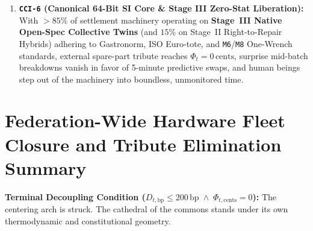 \begin{enumerate}
    \item \textbf{\texttt{CCI-6} (Canonical 64-Bit SI Core \& Stage III Zero-Stat Liberation):} With $>85\%$ of settlement machinery operating on \textbf{Stage~III Native Open-Spec Collective Twins} (and $15\%$ on Stage~II Right-to-Repair Hybrids) adhering to Gastronorm, ISO Euro-tote, and \texttt{M6}/\texttt{M8} One-Wrench standards, external spare-part tribute reaches $\Phi_t = 0\,\text{cents}$, surprise mid-batch breakdowns vanish in favor of 5-minute predictive swaps, and human beings step out of the machinery into boundless, unmonitored time.
\end{enumerate}

\section{Federation-Wide Hardware Fleet Closure and Tribute Elimination Summary}
\begin{table}[htbp]
\centering
\caption{Scenario Omega (\texttt{SCN-OMEGA-DECOUPLING}) Federation-Wide Hardware Closure and Terminal Tribute Elimination}
\label{tab:app24-omega-hardware}
\small
{}
\end{table}

\textbf{Terminal Decoupling Condition ($D_{t,\mathrm{bp}} \le 200\,\mathrm{bp} \;\land\; \Phi_{t,\mathrm{cents}} = 0$):} The centering arch is struck. The cathedral of the commons stands under its own thermodynamic and constitutional geometry.
